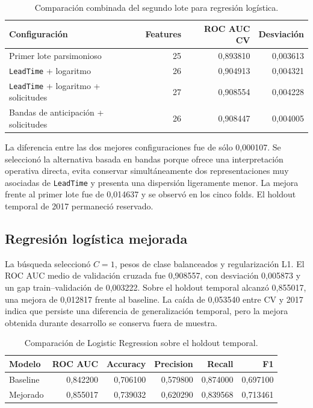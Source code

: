 \begin{table}[htbp]
    \centering
    \caption{Comparación combinada del segundo lote para regresión logística.}
    \label{tab:second-feature-batch}
    \begin{tabular}{lrrr}
        \toprule
        Configuración & Features & ROC AUC CV & Desviación \\
        \midrule
        Primer lote parsimonioso & 25 & 0,893810 & 0,003613 \\
        \texttt{LeadTime} + logaritmo & 26 & 0,904913 & 0,004321 \\
        \texttt{LeadTime} + logaritmo + solicitudes & 27 & 0,908554 & 0,004228 \\
        Bandas de anticipación + solicitudes & 26 & 0,908447 & 0,004005 \\
        \bottomrule
    \end{tabular}
\end{table}

La diferencia entre las dos mejores configuraciones fue de sólo 0,000107. Se
seleccionó la alternativa basada en bandas porque ofrece una interpretación
operativa directa, evita conservar simultáneamente dos representaciones muy
asociadas de \texttt{LeadTime} y presenta una dispersión ligeramente menor.
La mejora frente al primer lote fue de 0,014637 y se observó en los cinco
folds. El holdout temporal de 2017 permaneció reservado.

\subsection{Regresión logística mejorada}

La búsqueda seleccionó $C=1$, pesos de clase balanceados y regularización L1.
El ROC AUC medio de validación cruzada fue 0,908557, con desviación 0,005873 y
un gap train--validación de 0,003222. Sobre el holdout temporal alcanzó
0,855017, una mejora de 0,012817 frente al baseline. La caída de 0,053540 entre
CV y 2017 indica que persiste una diferencia de generalización temporal, pero
la mejora obtenida durante desarrollo se conserva fuera de muestra.

\begin{table}[htbp]
    \centering
    \caption{Comparación de Logistic Regression sobre el holdout temporal.}
    \label{tab:logistic-comparison}
    \begin{tabular}{lrrrrr}
        \toprule
        Modelo & ROC AUC & Accuracy & Precision & Recall & F1 \\
        \midrule
        Baseline & 0,842200 & 0,706100 & 0,579800 & 0,874000 & 0,697100 \\
        Mejorado & 0,855017 & 0,739032 & 0,620290 & 0,839568 & 0,713461 \\
        \bottomrule
    \end{tabular}
\end{table}

